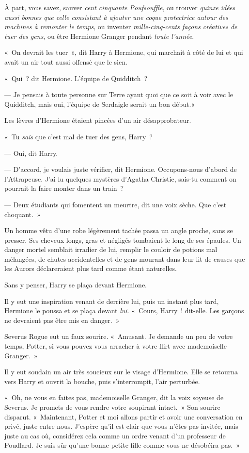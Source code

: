 À part, vous savez, sauver \emph{cent cinquante Poufsouffle}, ou trouver \emph{quinze idées aussi bonnes que celle consistant à ajouter une coque protectrice autour des machines à remonter le temps}, ou inventer \emph{mille-cinq-cents façons créatives de tuer des gens}, ou être Hermione Granger pendant \emph{toute l'année}.

«~On devrait les tuer~», dit Harry à Hermione, qui marchait à côté de lui et qui avait un air tout aussi offensé que le sien.

«~Qui~? dit Hermione. L'équipe de Quidditch~?

--- Je pensais à toute personne sur Terre ayant quoi que ce soit à voir avec le Quidditch, mais oui, l'équipe de Serdaigle serait un bon début.«~

Les lèvres d'Hermione étaient pincées d'un air désapprobateur.

«~Tu \emph{sais} que c'est mal de tuer des gens, Harry~?

--- Oui, dit Harry.

--- D'accord, je voulais juste vérifier, dit Hermione. Occupons-nous d'abord de l'Attrapeuse. J'ai lu quelques mystères d'Agatha Christie, sais-tu comment on pourrait la faire monter dans un train~?

--- Deux étudiants qui fomentent un meurtre, dit une voix sèche. Que c'est choquant.~»

Un homme vêtu d’une robe légèrement tachée passa un angle proche, sans se presser. Ses cheveux longs, gras et négligés tombaient le long de ses épaules. Un danger mortel semblait irradier de lui, remplir le couloir de potions mal mélangées, de chutes accidentelles et de gens mourant dans leur lit de causes que les Aurors déclareraient plus tard comme étant naturelles.

Sans y penser, Harry se plaça devant Hermione.

Il y eut une inspiration venant de derrière lui, puis un instant plus tard, Hermione le poussa et se plaça devant \emph{lui}. «~Cours, Harry~! dit-elle. Les garçons ne devraient pas être mis en danger.~»

Severus Rogue eut un faux sourire. «~Amusant. Je demande un peu de votre temps, Potter, si vous pouvez vous arracher à votre flirt avec mademoiselle Granger.~»

Il y eut soudain un air très soucieux sur le visage d'Hermione. Elle se retourna vers Harry et ouvrit la bouche, puis s'interrompit, l'air perturbée.

«~Oh, ne vous en faites pas, mademoiselle Granger, dit la voix soyeuse de Severus. Je promets de vous rendre votre soupirant intact.~» Son sourire disparut. «~Maintenant, Potter et moi allons partir et avoir une conversation en privé, juste entre nous. J'espère qu'il est clair que vous n'êtes pas invitée, mais juste au cas où, considérez cela comme un ordre venant d'un professeur de Poudlard. Je suis sûr qu'une bonne petite fille comme vous ne désobéira pas.~»

